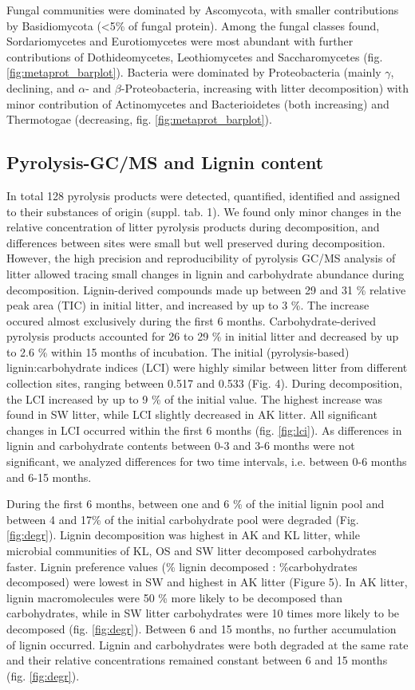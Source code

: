 Fungal communities were dominated by Ascomycota, with smaller contributions by Basidiomycota (<5\% of fungal protein).  Among the fungal classes found, Sordariomycetes and Eurotiomycetes were most abundant with further contributions of Dothideomycetes, Leothiomycetes and Saccharomycetes (fig. \ref{fig:metaprot_barplot}). Bacteria were dominated by Proteobacteria (mainly $\gamma$, declining, and $\alpha$- and $\beta$-Proteobacteria, increasing with litter decomposition) with minor contribution of Actinomycetes and Bacterioidetes (both increasing) and Thermotogae (decreasing, fig. \ref{fig:metaprot_barplot}).

\subsection*{Pyrolysis-GC/MS and Lignin content}
In total 128 pyrolysis products were detected, quantified, identified and assigned to their substances of origin (suppl. tab. 1). We found only minor changes in the relative concentration of litter pyrolysis products during decomposition, and differences between sites were small but well preserved during decomposition. However, the high precision and reproducibility of pyrolysis GC/MS analysis of litter allowed tracing small changes in lignin and carbohydrate abundance during decomposition. Lignin-derived compounds made up between 29 and 31 \% relative peak area (TIC) in initial litter, and increased by up to 3 \%. The increase occured almost exclusively during the first 6 months. Carbohydrate-derived pyrolysis products accounted for 26 to 29 \% in initial litter and decreased by up to 2.6 \% within 15 months of incubation. The initial (pyrolysis-based) lignin:carbohydrate indices (LCI) were highly similar between litter from different collection sites, ranging between 0.517 
and 0.533 (Fig. 4). During decomposition, the LCI increased by up to 9 \% of the initial value. The highest increase was found in SW litter, while LCI slightly decreased in AK litter. All significant changes in LCI  occurred within the first 6 months (fig. \ref{fig:lci}). As differences in lignin and carbohydrate contents between 0-3 and 3-6 months were not significant, we analyzed differences for two time intervals, i.e. between 0-6 months and 6-15 months.

During the first 6 months, between one and 6 \% of the initial lignin pool and between 4 and 17\% of the initial carbohydrate pool were degraded (Fig. \ref{fig:degr}). Lignin decomposition was highest in AK and KL litter, while microbial communities of KL, OS and SW litter decomposed carbohydrates faster. Lignin preference values (\% lignin decomposed : \%carbohydrates decomposed) were lowest in SW and highest in AK litter (Figure 5). In AK litter, lignin macromolecules were 50 \% more likely to be decomposed than carbohydrates, while in SW litter carbohydrates were 10 times more likely to be decomposed (fig. \ref{fig:degr}). Between 6 and 15 months, no further accumulation of lignin occurred. Lignin and carbohydrates were both degraded at the same rate and their relative concentrations remained constant between 6 and 15 months (fig. \ref{fig:degr}).

